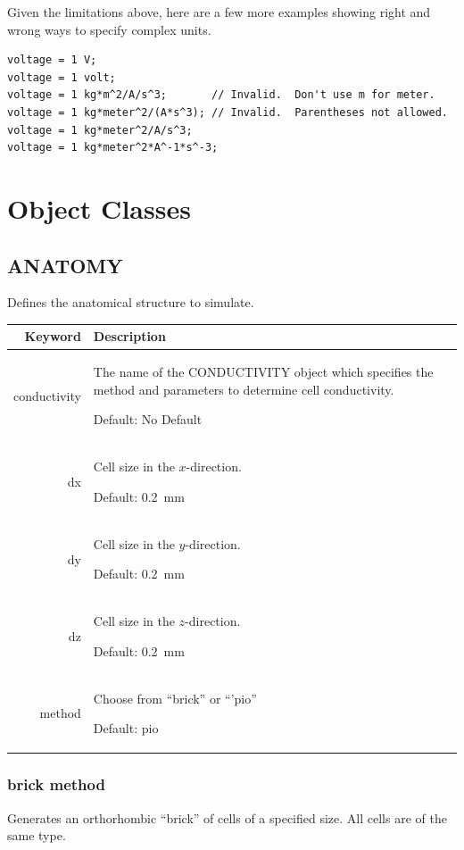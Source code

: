 \documentclass{article}
\begin{document}
Given the limitations above, here are a few more examples showing right
and wrong ways to specify complex units.
\begin{verbatim}
voltage = 1 V;
voltage = 1 volt;
voltage = 1 kg*m^2/A/s^3;       // Invalid.  Don't use m for meter.
voltage = 1 kg*meter^2/(A*s^3); // Invalid.  Parentheses not allowed.
voltage = 1 kg*meter^2/A/s^3;
voltage = 1 kg*meter^2*A^-1*s^-3;
\end{verbatim}


\appendix

\section{Object Classes}

\newenvironment{keywords}
{
  \par\vspace{12pt}\noindent
  \begin{tabular}{|r|p{0.7\textwidth}|}
    \hline
    Keyword & Description \\ \hline
  }
  {
  \end{tabular}\par
}

\def\kw#1#2#3{%
  #1 & {#2 \par Default: #3}\\ \hline%
}


\subsection{ANATOMY}

Defines the anatomical structure to simulate.

\begin{keywords}
  \kw{conductivity}{The name of the CONDUCTIVITY object which specifies
    the method and parameters to determine cell conductivity.}{No Default}
  \kw{dx}{Cell size in the $x$-direction.}{0.2~mm}
  \kw{dy}{Cell size in the $y$-direction.}{0.2~mm}
  \kw{dz}{Cell size in the $z$-direction.}{0.2~mm}
  \kw{method}{Choose from ``brick'' or ``'pio''}{pio}
\end{keywords}


\subsubsection{brick method}

Generates an orthorhombic ``brick'' of cells of a specified size.  All
cells are of the same type.
\end{document}
